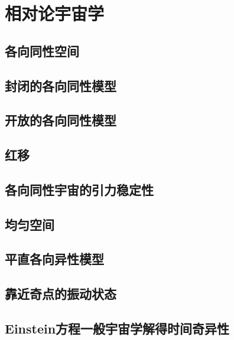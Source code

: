\chapter{相对论宇宙学}

\section{各向同性空间}

\section{封闭的各向同性模型}

\section{开放的各向同性模型}

\section{红移}

\section{各向同性宇宙的引力稳定性}

\section{均匀空间}

\section{平直各向异性模型}

\section{靠近奇点的振动状态}

\section{Einstein方程一般宇宙学解得时间奇异性}